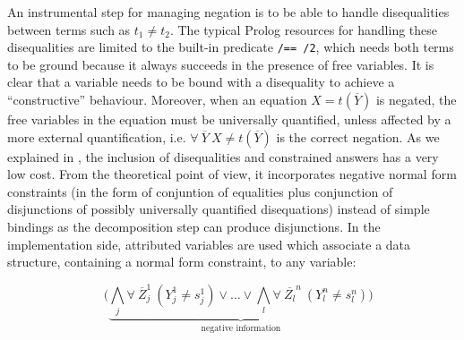 \documentclass{tlp}
\begin{document}
An instrumental step for managing negation is to be able to handle
disequalities between terms such as $t_1 \neq t_2$.  The typical
Prolog resources for handling these disequalities are limited to the
built-in predicate {\tt /== /2}, which needs both terms to be ground
because it always succeeds in the presence of free variables.  It is
clear that a variable needs to be bound with a disequality to achieve
a ``constructive'' behaviour.  Moreover, when an equation $X =
t(\overline{Y})$ is negated, the free variables in the equation must
be universally quantified, unless affected by a more external
quantification, i.e. $\forall~ \overline{Y}~X \neq t(\overline{Y})$ is
the correct negation.  As we explained in \cite{SusanaPADL2000}, the
inclusion of disequalities and constrained answers has a very low
cost. From the theoretical point of view, it incorporates negative normal form 
constraints (in the form of conjuntion of equalities plus conjunction of 
disjunctions of possibly universally quantified
disequations) instead of simple bindings as the decomposition step can produce 
disjunctions. In the implementation side, attributed variables are used 
which associate a data structure, containing a
normal form constraint, to any variable: 

\[~~~~( \underbrace{\bigwedge_j \forall~ \overline{Z}_j^1~(Y_j^1 \neq s_j^1) 
\vee \ldots \vee \bigwedge_l \forall~ \overline{Z_l}^n~(Y_l^n \neq s_l^n) ) }_{\mbox{negative information}} \]




\end{document}
